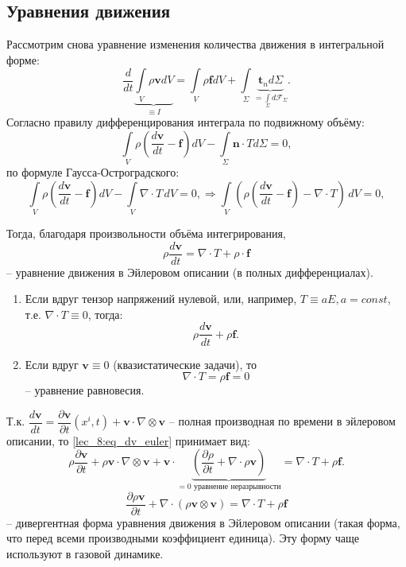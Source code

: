 \subsection{Уравнения движения}
Рассмотрим снова уравнение изменения количества движения в интегральной форме:
\[
  \dfrac{d}{dt} \underbrace{\int\limits_V \rho \mathbf{v} dV}_{\equiv I} = 
  \int\limits_V \rho \mathbf{f} dV + \int\limits_\Sigma \underbrace{\mathbf{t}_n d\Sigma}_{= \int\limits_{\Sigma} d\mathbf{\mathcal{F}}_\Sigma}.
\]
Согласно правилу дифференцирования интеграла по подвижному объёму:
\[
  \int\limits_V \rho \left( \dfrac{d\mathbf{v}}{dt} - \mathbf{f} \right) dV
  - \int\limits_\Sigma \mathbf{n} \cdot T d\Sigma = 0,
\]
по формуле Гаусса-Остроградского:
\[
  \int\limits_V \rho \left( \dfrac{d\mathbf{v}}{dt} - \mathbf{f} \right) dV
  - \int\limits_V \nabla \cdot T \, dV = 0,
  \Rightarrow
  \int\limits_V \left(
    \rho \left( \dfrac{d\mathbf{v}}{dt} - \mathbf{f} \right)
  - \nabla \cdot T \right) \, dV = 0,
\]

Тогда, благодаря произвольности объёма интегрирования,
\begin{equation}\label{lec_8:eq_dv_euler}
  \rho \dfrac{d\mathbf{v}}{dt}
  = \nabla \cdot T + \rho \cdot \mathbf{f}
\end{equation}
-- уравнение движения в Эйлеровом описании (в полных дифференциалах).


\begin{remark}

  \begin{enumerate}
    \item Если вдруг тензор напряжений нулевой, или, например, $T \equiv a E, a = const$,
      т.е. $\nabla \cdot T \equiv 0$, тогда:
      \[
        \rho \dfrac{d\mathbf{v}}{dt} + \rho \mathbf{f}.
      \]

    \item Если вдруг $\mathbf{v} \equiv 0$ (квазистатические задачи), то
      \[
        \nabla \cdot T = \rho \mathbf{f} = 0
      \]
      --  уравнение равновесия.
  \end{enumerate}
\end{remark}

Т.к. $\dfrac{d\mathbf{v}}{dt} = \dfrac{\partial \mathbf{v}}{\partial t} (x^i, t) + \mathbf{v} \cdot \nabla \otimes \mathbf{v}$ -- полная производная по времени в эйлеровом
описании, то \eqref{lec_8:eq_dv_euler} принимает вид:
\[
  \rho \dfrac{\partial \mathbf{v}}{\partial t} + \rho \mathbf{v} \cdot \nabla \otimes \mathbf{v}
  + \mathbf{v} \cdot
  \underbrace{\left( \dfrac{\partial \rho}{\partial t} + \nabla \cdot \rho\mathbf{v} \right)}_{=0 \text{ уравнение неразрывности}}
  = \nabla \cdot T + \rho \mathbf{f}.
\]
\[
  \dfrac{\partial \rho \mathbf{v}}{\partial t} + \nabla \cdot \left( \rho \mathbf{v}\otimes \mathbf{v} \right) = \nabla \cdot T + \rho \mathbf{f}
\]
-- дивергентная форма уравнения движения в Эйлеровом описании (такая форма,
что перед всеми производными коэффициент единица). Эту форму чаще используют в 
газовой динамике.

